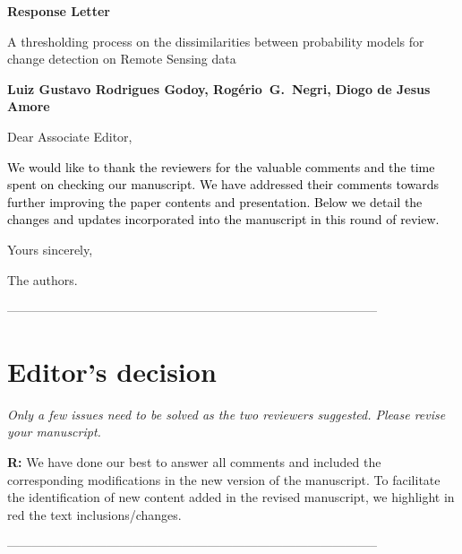 \documentclass[11pt]{report}
\begin{document}
\begin{center}
\large{\textbf{Response Letter}}

\vglue 0.3cm

\huge{A thresholding process on the dissimilarities between probability models for change detection on Remote Sensing data}
\end{center}

\begin{center}
\textbf{Luiz Gustavo Rodrigues Godoy, Rog\'{e}rio~G.~Negri, Diogo de Jesus Amore}
\end{center}

\date{\today}


\vspace{2cm}
\noindent Dear Associate Editor,
\bigskip

\textcolor{black}{We would like to thank the reviewers for the valuable comments and the time spent on checking our manuscript. 
We have addressed their comments towards further improving the paper contents and presentation. 
Below we detail the changes and updates incorporated into the manuscript in this round of review.}


\medskip
\noindent Yours sincerely,

\begin{flushright}
\noindent The authors.
\end{flushright}




\noindent-----------------------------------------------------------------------------------------
\section*{Editor's decision}

\textit{Only a few issues need to be solved as the two reviewers suggested. Please revise your manuscript.}

\medskip

\textbf{R:} We have done our best to answer all comments and included the corresponding modifications in the new version of the manuscript. 
To facilitate the identification of new content added in the revised manuscript, we highlight in red the text inclusions/changes.



\noindent-----------------------------------------------------------------------------------------
\end{document}
